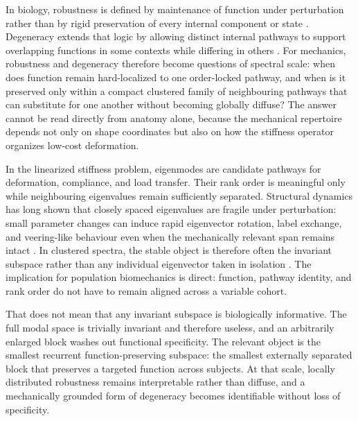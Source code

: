 \documentclass[11pt]{article}
\begin{document}
In biology, robustness is defined by maintenance of function under perturbation rather than by rigid preservation of every internal component or state \citep{Kitano2007,Khammash2016}.
Degeneracy extends that logic by allowing distinct internal pathways to support overlapping functions in some contexts while differing in others \citep{Whitacre2010,Whitacre2012}.
For mechanics, robustness and degeneracy therefore become questions of spectral scale: when does function remain hard-localized to one order-locked pathway, and when is it preserved only within a compact clustered family of neighbouring pathways that can substitute for one another without becoming globally diffuse?
The answer cannot be read directly from anatomy alone, because the mechanical repertoire depends not only on shape coordinates but also on how the stiffness operator organizes low-cost deformation.

In the linearized stiffness problem, eigenmodes are candidate pathways for deformation, compliance, and load transfer.
Their rank order is meaningful only while neighbouring eigenvalues remain sufficiently separated.
Structural dynamics has long shown that closely spaced eigenvalues are fragile under perturbation: small parameter changes can induce rapid eigenvector rotation, label exchange, and veering-like behaviour even when the mechanically relevant span remains intact \citep{Pierre1988,ManconiMace2017}.
In clustered spectra, the stable object is therefore often the invariant subspace rather than any individual eigenvector taken in isolation \citep{GhoshGhanem2012}.
The implication for population biomechanics is direct: function, pathway identity, and rank order do not have to remain aligned across a variable cohort.

That does not mean that any invariant subspace is biologically informative.
The full modal space is trivially invariant and therefore useless, and an arbitrarily enlarged block washes out functional specificity.
The relevant object is the smallest recurrent function-preserving subspace: the smallest externally separated block that preserves a targeted function across subjects.
At that scale, locally distributed robustness remains interpretable rather than diffuse, and a mechanically grounded form of degeneracy becomes identifiable without loss of specificity.
\end{document}
